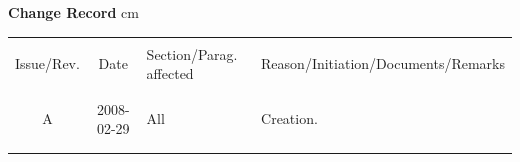 \documentclass[letterpaper,11pt]{article}
\begin{document}
%
\normalsize
\begin{center}
{\bf Change Record}
 cm
\begin{tabular}{|c|c|l|l|}   
\hline& & & \\
Issue/Rev. & Date &  Section/Parag. affected &
 Reason/Initiation/Documents/Remarks  \\
& & &  \\     \hline
            &            &          &              \\
 A          & 2008-02-29 & All      &  Creation.   \\   %
            &            &          &              \\
            &            &          &              \\
\hline
\end{tabular}
\end{center}
\normalsize


%
\newpage

\tableofcontents
\listoffigures         %

\newpage

%
\parskip=2mm
\setcounter{page}{1}











\end{document}
